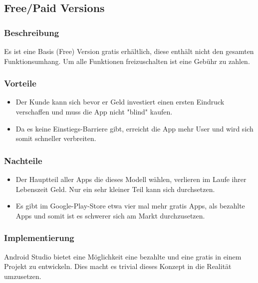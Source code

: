 \documentclass[FIPLY_base.tex]{subfiles}
\author{Gerald Irsiegler}
\date{25. Februar 2016}
\begin{document}
\subsection{Free/Paid Versions}


\subsubsection{Beschreibung}
Es ist eine Basis (Free) Version gratis erhältlich, diese enthält nicht den gesamten Funktionsumhang.
Um alle Funktionen freizuschalten ist eine Gebühr zu zahlen.

\subsubsection{Vorteile}
\begin{itemize}
\item Der Kunde kann sich bevor er Geld investiert einen ersten Eindruck verschaffen und muss die App nicht "blind" kaufen.
\item Da es keine Einstiegs-Barriere gibt, erreicht die App mehr User und wird sich somit schneller verbreiten.
\end{itemize}

\subsubsection{Nachteile}
\begin{itemize}
\item Der Hauptteil aller Apps die dieses Modell wählen, verlieren im Laufe ihrer Lebenszeit Geld. Nur ein sehr kleiner Teil kann sich durchsetzen.
\item Es gibt im Google-Play-Store etwa vier mal mehr gratis Apps, als bezahlte Apps und somit ist es schwerer sich am Markt durchzusetzen.
\end{itemize}

\subsubsection{Implementierung}

Android Studio bietet eine Möglichkeit eine bezahlte und eine gratis in einem Projekt zu entwickeln.
 Dies macht es trivial dieses Konzept in die Realität umzusetzen.
\end{document}
